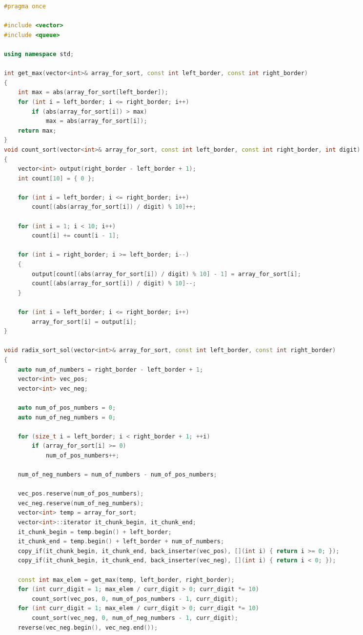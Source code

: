 \documentclass[a4paper,final]{report}
\begin{document}
\begin{spacing}{1.5}
\begin{lstlisting}[language=C++]
#pragma once

#include <vector>
#include <queue>

using namespace std;

int get_max(vector<int>& array_for_sort, const int left_border, const int right_border)
{
	int max = abs(array_for_sort[left_border]);
	for (int i = left_border; i <= right_border; i++)
		if (abs(array_for_sort[i]) > max)
			max = abs(array_for_sort[i]);
	return max;
}
void count_sort(vector<int>& array_for_sort, const int left_border, const int right_border, int digit)
{
	vector<int> output(right_border - left_border + 1);
	int count[10] = { 0 };

	for (int i = left_border; i <= right_border; i++)
		count[(abs(array_for_sort[i]) / digit) % 10]++;

	for (int i = 1; i < 10; i++)
		count[i] += count[i - 1];

	for (int i = right_border; i >= left_border; i--)
	{
		output[count[(abs(array_for_sort[i]) / digit) % 10] - 1] = array_for_sort[i];
		count[(abs(array_for_sort[i]) / digit) % 10]--;
	}

	for (int i = left_border; i <= right_border; i++)
		array_for_sort[i] = output[i];
}

void radix_sort_sol(vector<int>& array_for_sort, const int left_border, const int right_border)
{
	auto num_of_numbers = right_border - left_border + 1;
	vector<int> vec_pos;
	vector<int> vec_neg;

	auto num_of_pos_numbers = 0;
	auto num_of_neg_numbers = 0;

	for (size_t i = left_border; i < right_border + 1; ++i)
		if (array_for_sort[i] >= 0)
			num_of_pos_numbers++;

	num_of_neg_numbers = num_of_numbers - num_of_pos_numbers;

	vec_pos.reserve(num_of_pos_numbers);
	vec_neg.reserve(num_of_neg_numbers);
	vector<int> temp = array_for_sort;
	vector<int>::iterator it_chunk_begin, it_chunk_end;
	it_chunk_begin = temp.begin() + left_border;
	it_chunk_end = temp.begin() + left_border + num_of_numbers;
	copy_if(it_chunk_begin, it_chunk_end, back_inserter(vec_pos), [](int i) { return i >= 0; });
	copy_if(it_chunk_begin, it_chunk_end, back_inserter(vec_neg), [](int i) { return i < 0; });

	const int max_elem = get_max(temp, left_border, right_border);
	for (int curr_digit = 1; max_elem / curr_digit > 0; curr_digit *= 10)
		count_sort(vec_pos, 0, num_of_pos_numbers - 1, curr_digit);
	for (int curr_digit = 1; max_elem / curr_digit > 0; curr_digit *= 10)
		count_sort(vec_neg, 0, num_of_neg_numbers - 1, curr_digit);
	reverse(vec_neg.begin(), vec_neg.end());


\end{lstlisting}
\end{spacing}
\end{document}
